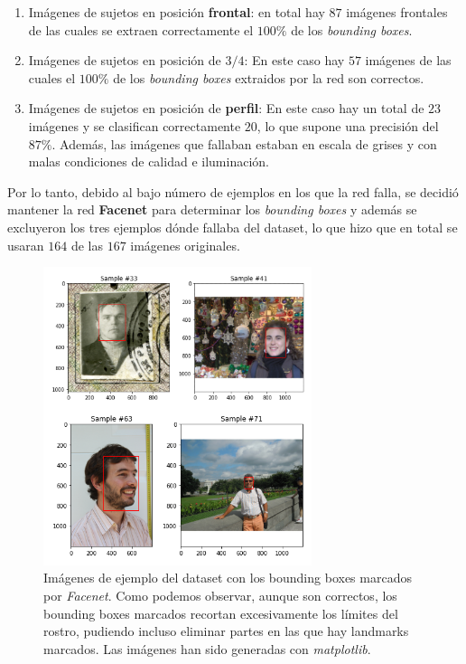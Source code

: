             \begin{enumerate}
                \item Imágenes de sujetos en posición \textbf{ frontal}: en total hay $87$ imágenes frontales de las cuales se extraen correctamente el \textbf{$100\%$} de los \textit{bounding boxes}.
                \item Imágenes de sujetos en posición de \textbf{$3/4$}: En este caso hay $57$ imágenes de las cuales el \textbf{$100\%$} de los \textit{bounding boxes} extraidos por la red son correctos.
                \item Imágenes de sujetos en posición de \textbf{perfil}: En este caso hay un total de $23$ imágenes y se clasifican correctamente $20$, lo que supone una precisión del \textbf{$87\%$}. Además, las imágenes que fallaban estaban en escala de grises y con malas condiciones de calidad e iluminación.
            \end{enumerate}

            \noindent Por lo tanto, debido al bajo número de ejemplos en los que la red falla, se decidió mantener la red \textbf{Facenet} para determinar los \textit{bounding boxes} y además se excluyeron los tres ejemplos dónde fallaba del dataset, lo que hizo que en total se usaran $164$ de las $167$ imágenes originales.

            \medskip 

            \begin{figure}[!h]
                \centering
                \includegraphics[width=0.7\textwidth]{img/imagenes_ejemplo_bb.png}
                \caption{Imágenes de ejemplo del dataset con los bounding boxes marcados por \textit{Facenet}. Como podemos observar, aunque son correctos, los bounding boxes marcados recortan excesivamente los límites del rostro, pudiendo incluso eliminar partes en las que hay landmarks marcados. Las imágenes han sido generadas con \textit{matplotlib}.}
                \label{fig:Ejemplo_bb}
            \end{figure}


